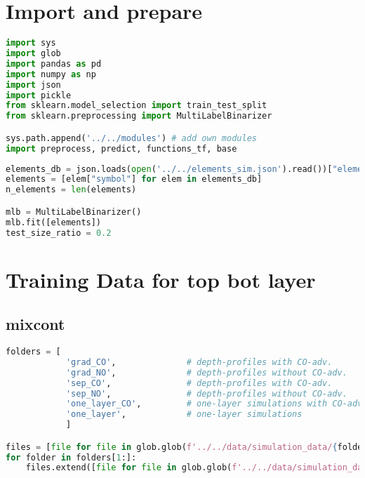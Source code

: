 \hypertarget{import-and-prepare}{%
\section*{Import and prepare}\label{import-and-prepare}}
\begin{lstlisting}[language=Python]
import sys
import glob
import pandas as pd
import numpy as np
import json
import pickle
from sklearn.model_selection import train_test_split
from sklearn.preprocessing import MultiLabelBinarizer

sys.path.append('../../modules') # add own modules
import preprocess, predict, functions_tf, base
\end{lstlisting}

\begin{lstlisting}[language=Python]
elements_db = json.loads(open('../../elements_sim.json').read())["elements"]
elements = [elem["symbol"] for elem in elements_db]
n_elements = len(elements)

mlb = MultiLabelBinarizer()
mlb.fit([elements])
test_size_ratio = 0.2
\end{lstlisting}

\hypertarget{training-data-for-top-bot-layer}{%
\section*{Training Data for top bot
layer}\label{training-data-for-top-bot-layer}}

\hypertarget{mixcont}{%
\subsection*{mixcont}\label{mixcont}}

\begin{lstlisting}[language=Python]
folders = [
            'grad_CO',              # depth-profiles with CO-adv.       with gradient layers
            'grad_NO',              # depth-profiles without CO-adv.    with gradient layers
            'sep_CO',               # depth-profiles with CO-adv.       with separated layers
            'sep_NO',               # depth-profiles without CO-adv.    with separated layers
            'one_layer_CO',         # one-layer simulations with CO-adv.
            'one_layer',            # one-layer simulations
            ]

files = [file for file in glob.glob(f'../../data/simulation_data/{folders[0]}/*.spc')]
for folder in folders[1:]:
    files.extend([file for file in glob.glob(f'../../data/simulation_data/{folder}/*.spc')])
\end{lstlisting}

